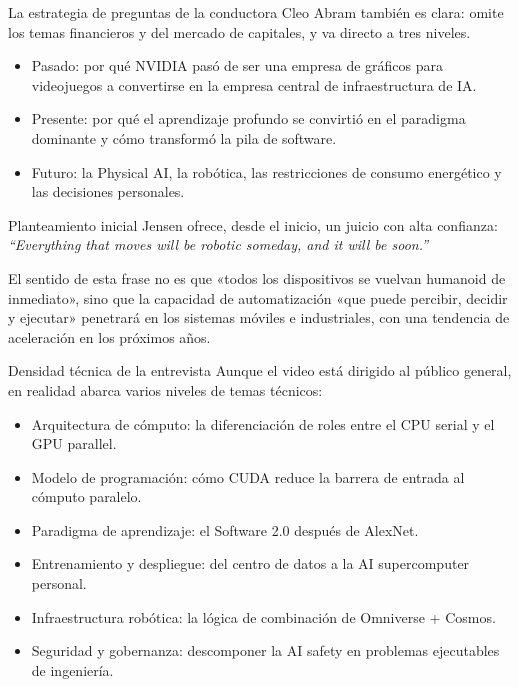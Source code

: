\documentclass[a4paper]{article}
\begin{document}
La estrategia de preguntas de la conductora Cleo Abram también es clara: omite los temas financieros y del mercado de capitales, y va directo a tres niveles.
\begin{itemize}
    \item Pasado: por qué NVIDIA pasó de ser una empresa de gráficos para videojuegos a convertirse en la empresa central de infraestructura de IA.
    \item Presente: por qué el aprendizaje profundo se convirtió en el paradigma dominante y cómo transformó la pila de software.
    \item Futuro: la Physical AI, la robótica, las restricciones de consumo energético y las decisiones personales.
\end{itemize}

\begin{importantbox}{Planteamiento inicial}
Jensen ofrece, desde el inicio, un juicio con alta confianza: \textit{``Everything that moves will be robotic someday, and it will be soon.''}

El sentido de esta frase no es que «todos los dispositivos se vuelvan humanoid de inmediato», sino que la capacidad de automatización «que puede percibir, decidir y ejecutar» penetrará en los sistemas móviles e industriales, con una tendencia de aceleración en los próximos años.
\end{importantbox}

\begin{knowledgebox}{Densidad técnica de la entrevista}
Aunque el video está dirigido al público general, en realidad abarca varios niveles de temas técnicos:
\begin{itemize}
    \item Arquitectura de cómputo: la diferenciación de roles entre el CPU serial y el GPU parallel.
    \item Modelo de programación: cómo CUDA reduce la barrera de entrada al cómputo paralelo.
    \item Paradigma de aprendizaje: el Software 2.0 después de AlexNet.
    \item Entrenamiento y despliegue: del centro de datos a la AI supercomputer personal.
    \item Infraestructura robótica: la lógica de combinación de Omniverse + Cosmos.
    \item Seguridad y gobernanza: descomponer la AI safety en problemas ejecutables de ingeniería.
\end{itemize}
\end{knowledgebox}
\end{document}
